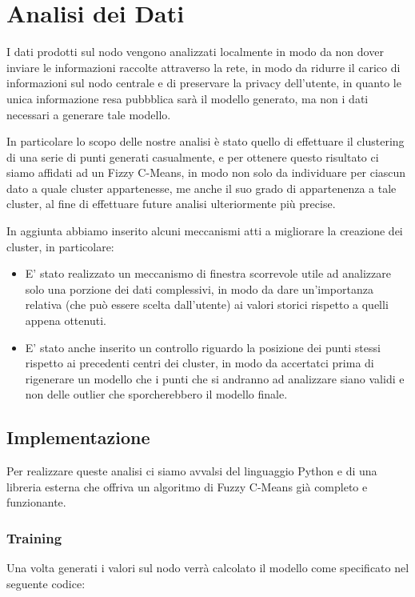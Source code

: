 \chapter{Analisi dei Dati}
I dati prodotti sul nodo vengono analizzati localmente in modo da non dover inviare le informazioni raccolte attraverso la rete, in modo da ridurre il carico di informazioni sul nodo centrale
e di preservare la privacy dell'utente, in quanto le unica informazione resa pubbblica sarà il modello generato, ma non i dati necessari a generare tale modello.

In particolare lo scopo delle nostre analisi è stato quello di effettuare il clustering di una serie di punti generati casualmente, e per ottenere questo risultato ci siamo affidati ad un Fizzy C-Means, in modo
non solo da individuare per ciascun dato a quale cluster appartenesse, me anche il suo grado di appartenenza a tale cluster, al fine di effettuare future analisi ulteriormente più precise.

In aggiunta abbiamo inserito alcuni meccanismi atti a migliorare la creazione dei cluster, in particolare:
\begin{itemize}
  \item E' stato realizzato un meccanismo di finestra scorrevole utile ad analizzare solo una porzione dei dati complessivi, in modo da dare un'importanza relativa (che può essere scelta dall'utente) ai valori storici rispetto a quelli appena ottenuti.
  \item E' stato anche inserito un controllo riguardo la posizione dei punti stessi rispetto ai precedenti centri dei cluster, in modo da accertatci prima di rigenerare un modello che i punti che si andranno ad analizzare siano validi e non delle outlier che sporcherebbero il modello finale.
\end{itemize}

\section{Implementazione}

Per realizzare queste analisi ci siamo avvalsi del linguaggio Python e di una libreria esterna che offriva un algoritmo di Fuzzy C-Means già completo e funzionante.

\subsection{Training}

Una volta generati i valori sul nodo verrà calcolato il modello come specificato nel seguente codice:

